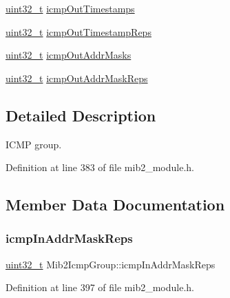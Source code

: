\begin{DoxyCompactItemize}
\item 
\hyperlink{stdint_8h_a435d1572bf3f880d55459d9805097f62}{uint32\+\_\+t} \hyperlink{structMib2IcmpGroup_ab64f8273aef3f1aa8fb0da7a11fb3997}{icmp\+Out\+Timestamps}
\item 
\hyperlink{stdint_8h_a435d1572bf3f880d55459d9805097f62}{uint32\+\_\+t} \hyperlink{structMib2IcmpGroup_a7433975731582f0c52598b6b9a9d6294}{icmp\+Out\+Timestamp\+Reps}
\item 
\hyperlink{stdint_8h_a435d1572bf3f880d55459d9805097f62}{uint32\+\_\+t} \hyperlink{structMib2IcmpGroup_aac48c7dce1e34414f07a20c776a52288}{icmp\+Out\+Addr\+Masks}
\item 
\hyperlink{stdint_8h_a435d1572bf3f880d55459d9805097f62}{uint32\+\_\+t} \hyperlink{structMib2IcmpGroup_ae23bfb398db159b13bf9785901a7b0d1}{icmp\+Out\+Addr\+Mask\+Reps}
\end{DoxyCompactItemize}


\subsection{Detailed Description}
I\+C\+MP group. 

Definition at line 383 of file mib2\+\_\+module.\+h.



\subsection{Member Data Documentation}
\mbox{\label{structMib2IcmpGroup_afd494f1f923e1bf1fad9b7fea9641375}} 
\subsubsection{\texorpdfstring{icmp\+In\+Addr\+Mask\+Reps}{icmpInAddrMaskReps}}
{\footnotesize\ttfamily \hyperlink{stdint_8h_a435d1572bf3f880d55459d9805097f62}{uint32\+\_\+t} Mib2\+Icmp\+Group\+::icmp\+In\+Addr\+Mask\+Reps}



Definition at line 397 of file mib2\+\_\+module.\+h.

\mbox{\label{structMib2IcmpGroup_a614734b1493c033ae049e4e1c7111b92}} 
